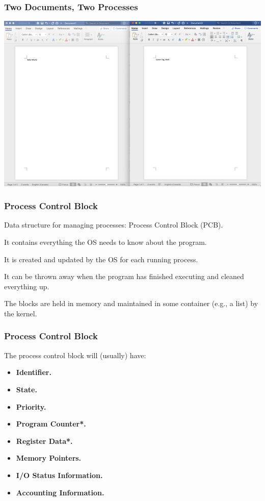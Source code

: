 \begin{frame}
	\frametitle{Two Documents, Two Processes}

	\begin{center}
		\includegraphics[width=\textwidth]{images/2docs.png}
	\end{center}


\end{frame}


\begin{frame}
	\frametitle{Process Control Block}

	Data structure for managing processes: \alert{Process Control Block} (PCB).

	It contains everything the OS needs to know about the program.

	It is created and updated by the OS for each running process.

	It can be thrown away when the program has finished executing and cleaned everything up.

	The blocks are held in memory and maintained in some container (e.g., a list) by the kernel.


\end{frame}

\begin{frame}
	\frametitle{Process Control Block}

	The process control block will (usually) have:
	\begin{itemize}
		\item \textbf{Identifier.}
		\item \textbf{State.}
		\item \textbf{Priority.}
		\item \textbf{Program Counter*.}
		\item \textbf{Register Data*.}
		\item \textbf{Memory Pointers.}
		\item \textbf{I/O Status Information.}
		\item \textbf{Accounting Information.}
	\end{itemize}

\end{frame}

